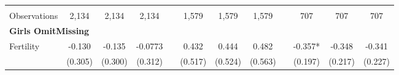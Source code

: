 \begin{landscape}
\begin{table}[htpb!]
\begin{center}
\begin{tabular}{lcccp{2mm}cccp{2mm}ccc}
\begin{footnotesize}\end{footnotesize}&\begin{footnotesize}\end{footnotesize}&\begin{footnotesize}\end{footnotesize}&\begin{footnotesize}\end{footnotesize}&\begin{footnotesize}\end{footnotesize}&\begin{footnotesize}\end{footnotesize}&\begin{footnotesize}\end{footnotesize}&\begin{footnotesize}\end{footnotesize}&\begin{footnotesize}\end{footnotesize}&\begin{footnotesize}\end{footnotesize}&\begin{footnotesize}\end{footnotesize}&\begin{footnotesize}\end{footnotesize}\\Observations&2,134&2,134&2,134&&1,579&1,579&1,579&&707&707&707\\
\multicolumn{12}{l}{\textbf{Girls OmitMissing}}\\ 
Fertility&-0.130&-0.135&-0.0773&&0.432&0.444&0.482&&-0.357*&-0.348&-0.341\\
&(0.305)&(0.300)&(0.312)&&(0.517)&(0.524)&(0.563)&&(0.197)&(0.217)&(0.227)\\

\end{tabular}
\end{center}
\end{table}
\end{landscape}
